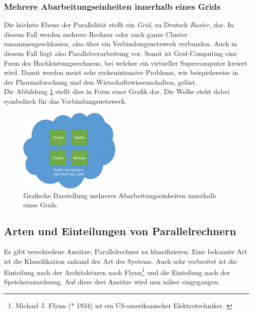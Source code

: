 			\subsubsection{Mehrere Abarbeitungseinheiten innerhalb eines Grids}
				\label{MehrereAbarbeitungseinheitenGrid}
			
				Die höchste Ebene der Parallelität stellt ein \textit{Grid}, zu Deutsch \textit{Raster}, dar. In diesem Fall werden mehrere Rechner oder auch ganze Cluster zusammengeschlossen, also über ein Verbindungsnetzwerk verbunden. Auch in diesem Fall liegt also Parallelverarbeitung vor. Somit ist Grid-Computing eine Form des Hochleistungsrechnens, bei welcher ein virtueller Supercomputer kreiert wird. Damit werden meist sehr rechenintensive Probleme, wie beispielsweise in der Pharmaforschung und den Wirtschaftswissenschaften, gelöst. \cite{GridWikipedia}\\
				Die Abbildung \ref{fig:EbenenDerParallelitaetGrid} stellt dies in Form einer Grafik dar. Die Wolke steht dabei symbolisch für das Verbindungsnetzwerk.
				
				\begin{figure}
					\centering	
					\includegraphics[width=5cm]{Abbildungen/Ebenen_der_Parallelitaet_Grid.png}
					\caption{Grafische Darstellung mehrerer Abarbeitungseinheiten innerhalb eines Grids.}
					\label{fig:EbenenDerParallelitaetGrid}
				\end{figure}
			
		\subsection{Arten und Einteilungen von Parallelrechnern}
		
			Es gibt verschiedene Ansätze, Parallelrechner zu klassifizieren. Eine bekannte Art ist die Klassifikation anhand der Art des Systems. Auch sehr verbreitet ist die Einteilung nach der Architekturen nach Flynn\footnote{Michael J. Flynn (* 1934) ist ein US-amerikanischer Elektrotechniker. \cite{FlynnWikipedia}} und die Einteilung nach der Speicheranordnung. Auf diese drei Ansätze wird nun näher eingegangen.
			
